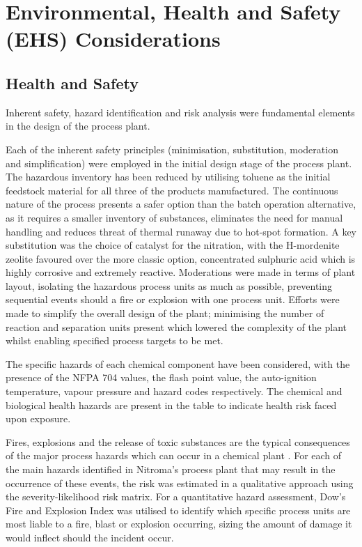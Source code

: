 \section{Environmental, Health and Safety (EHS) Considerations}
\label{sec:ehs}
\subsection{Health and Safety}

Inherent safety, hazard identification and risk analysis were fundamental elements in the design of the process plant. 

Each of the inherent safety principles (minimisation, substitution, moderation and simplification) were employed in the initial design stage of the process plant. The hazardous inventory has been reduced by utilising toluene as the initial feedstock material for all three of the products manufactured. The continuous nature of the process presents a safer option than the batch operation alternative, as it requires a smaller inventory of substances, eliminates the need for manual handling and reduces threat of thermal runaway due to hot-spot formation. A key substitution was the choice of catalyst for the nitration, with the H-mordenite zeolite favoured over the more classic option, concentrated sulphuric acid which is highly corrosive and extremely reactive. Moderations were made in terms of plant layout, isolating the hazardous process units as much as possible, preventing sequential events should a fire or explosion with one process unit. Efforts were made to simplify the overall design of the plant; minimising the number of reaction and separation units present which lowered the complexity of the plant whilst enabling specified process targets to be met. 

The specific hazards of each chemical component have been considered, with the presence of the NFPA 704 values, the flash point value, the auto-ignition temperature, vapour pressure and hazard codes respectively. The chemical and biological health hazards are present in the table to indicate health risk faced upon exposure.  

Fires, explosions and the release of toxic substances are the typical consequences of the major process hazards which can occur in a chemical plant \cite{mannan_lees_2012}. For each of the main hazards identified in Nitroma's process plant that may result in the occurrence of these events, the risk was estimated in a qualitative approach using the severity-likelihood risk matrix. For a quantitative hazard assessment, Dow's Fire and Explosion Index was utilised to identify which specific process units are most liable to  a fire, blast or explosion occurring, sizing the amount of damage it would inflect should the incident occur. 

